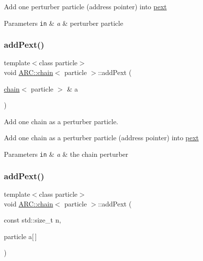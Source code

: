 Add one perturber particle (address pointer) into \hyperlink{classARC_1_1chain_a6e4f41c7d3f8d44a4a01734ff4ab20cf}{pext} 
\begin{DoxyParams}[1]{Parameters}
\mbox{\tt in}  & {\em a} & perturber particle \\
\hline
\end{DoxyParams}
\hypertarget{classARC_1_1chain_a5ab3934ce4a203cd57bfabcc3caf54b3}{}\label{classARC_1_1chain_a5ab3934ce4a203cd57bfabcc3caf54b3} 
\subsubsection{\texorpdfstring{add\+Pext()}{addPext()}\hspace{0.1cm}{\footnotesize\ttfamily [2/3]}}
{\footnotesize\ttfamily template$<$class particle$>$ \\
void \hyperlink{classARC_1_1chain}{A\+R\+C\+::chain}$<$ particle $>$\+::add\+Pext (\begin{DoxyParamCaption}\item[{\hyperlink{classARC_1_1chain}{chain}$<$ particle $>$ \&}]{a }\end{DoxyParamCaption})\hspace{0.3cm}{\ttfamily [inline]}}



Add one chain as a perturber particle. 

Add one chain as a perturber particle (address pointer) into \hyperlink{classARC_1_1chain_a6e4f41c7d3f8d44a4a01734ff4ab20cf}{pext} 
\begin{DoxyParams}[1]{Parameters}
\mbox{\tt in}  & {\em a} & the chain perturber \\
\hline
\end{DoxyParams}
\hypertarget{classARC_1_1chain_a71c8d6ac1e58694b8207aabc7266110f}{}\label{classARC_1_1chain_a71c8d6ac1e58694b8207aabc7266110f} 
\subsubsection{\texorpdfstring{add\+Pext()}{addPext()}\hspace{0.1cm}{\footnotesize\ttfamily [3/3]}}
{\footnotesize\ttfamily template$<$class particle$>$ \\
void \hyperlink{classARC_1_1chain}{A\+R\+C\+::chain}$<$ particle $>$\+::add\+Pext (\begin{DoxyParamCaption}\item[{const std\+::size\+\_\+t}]{n,  }\item[{particle}]{a\mbox{[}$\,$\mbox{]} }\end{DoxyParamCaption})\hspace{0.3cm}{\ttfamily [inline]}}



